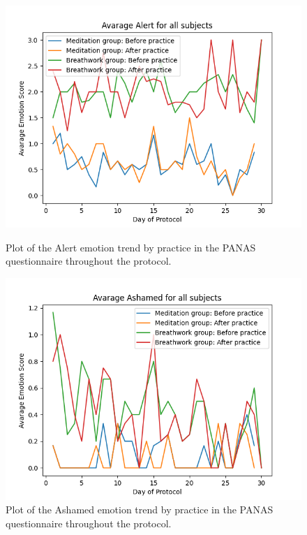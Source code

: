 \begin{figure}
    \centering
    \begin{minipage}{0.49\linewidth}
        \includegraphics[width=\linewidth]{Figures/panas/emotions/Alert.png}
        \caption{Plot of the Alert emotion trend by practice in the PANAS questionnaire throughout the protocol.}
        \label{fig:alert_by_practice}
    \end{minipage}
    \hfill %
    \begin{minipage}{0.49\linewidth}
        \includegraphics[width=\linewidth]{Figures/panas/emotions/Ashamed.png}
        \caption{Plot of the Ashamed emotion trend by practice in the PANAS questionnaire throughout the protocol.}
        \label{fig:ashamed_by_practice}
    \end{minipage}
\end{figure} %

